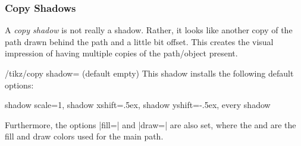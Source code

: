 \subsubsection{Copy Shadows}

A \emph{copy shadow} is not really a shadow. Rather, it looks like another copy
of the path drawn behind the path and a little bit offset. This creates the
visual impression of having multiple copies of the path/object present.

\begin{key}{/tikz/copy shadow= (default \normalfont empty)}
    This shadow installs the following default options:
\begin{codeexample}
  shadow scale=1, shadow xshift=.5ex, shadow yshift=-.5ex, every shadow
\end{codeexample}
    Furthermore, the options |fill=| and |draw=| are also set, where the  and  are
    the fill and draw colors used for the main path.
\begin{codeexample}[preamble={\usetikzlibrary{shadows,shapes.symbols}}]
\end{codeexample}
\end{key}


